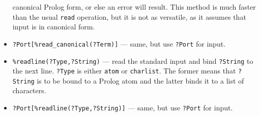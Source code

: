 \documentclass[11pt]{article}
\begin{document}
\begin{itemize}
  canonical Prolog form, or else an error will result. This method is much
  faster than the usual {\tt read} operation, but it is not as versatile,
  as it assumes that input is in canonical form.
\item {\tt ?Port[\%read\_canonical(?Term)]} --- same, but use {\tt ?Port} for
  input.
\item {\tt \verb|%|readline(?Type,?String)} --- read the standard input and bind
  {\tt ?String} to the next line. {\tt ?Type} is either {\tt atom} or
  {\tt charlist}. The former means that {\tt ?String} is to be bound to a
  Prolog atom and the latter binds it to a list of characters.
\item {\tt ?Port[\%readline(?Type,?String)]} --- same, but use {\tt ?Port} for
  input.
\end{itemize}
\end{document}
